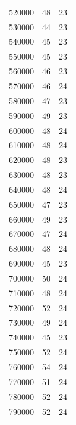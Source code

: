 \documentclass{article}
\begin{document}
\begin{longtable}{c|c|c}
           520000 &            48 &            23 \\
           530000 &            44 &            23 \\
           540000 &            45 &            23 \\
           550000 &            45 &            23 \\
           560000 &            46 &            23 \\
           570000 &            46 &            24 \\
           580000 &            47 &            23 \\
           590000 &            49 &            23 \\
           600000 &            48 &            24 \\
           610000 &            48 &            24 \\
           620000 &            48 &            23 \\
           630000 &            48 &            23 \\
           640000 &            48 &            24 \\
           650000 &            47 &            23 \\
           660000 &            49 &            23 \\
           670000 &            47 &            24 \\
           680000 &            48 &            24 \\
           690000 &            45 &            23 \\
           700000 &            50 &            24 \\
           710000 &            48 &            24 \\
           720000 &            52 &            24 \\
           730000 &            49 &            24 \\
           740000 &            45 &            23 \\
           750000 &            52 &            24 \\
           760000 &            54 &            24 \\
           770000 &            51 &            24 \\
           780000 &            52 &            24 \\
           790000 &            52 &            24 \\

\end{longtable}
\end{document}
